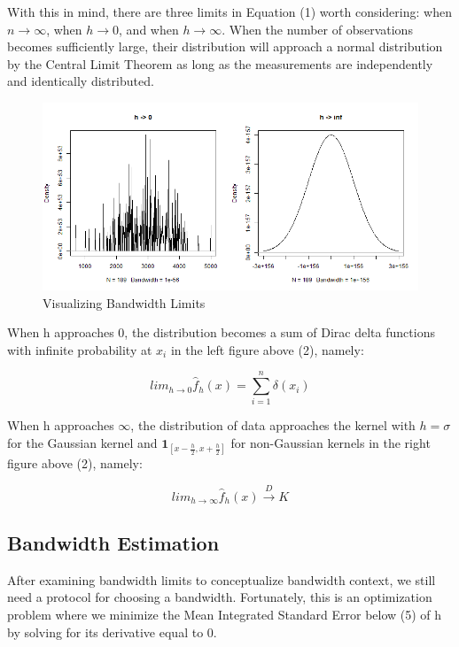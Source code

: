 \documentclass{article}
\begin{document}
With this in mind, there are three limits in Equation (1) worth considering: when $n \rightarrow \infty$, when $h \rightarrow 0$, and when $h \rightarrow \infty$. When the number of observations becomes sufficiently large, their distribution will approach a normal distribution by the Central Limit Theorem as long as the measurements are independently and identically distributed.

\begin{figure}[h]
    \centering
    \includegraphics[scale = 0.33]{volume/BandwidthLimits.png}
    \caption{Visualizing Bandwidth Limits}
    \label{fig:band-limts}
\end{figure}

\newpage

When h approaches 0, the distribution becomes a sum of Dirac delta functions with infinite probability at $x_i$ in the left figure above (2), namely:

\begin{equation}
    lim_{h \rightarrow0 } \hat f_h(x) = \sum_{i=1}^n \delta(x_i)
\end{equation}

When h approaches $\infty$, the distribution of data approaches the kernel with $h = \sigma$ for the Gaussian kernel and $\mathbf{1}_{[x-\frac{h}{2}, x+\frac{h}{2}]}$ for non-Gaussian kernels in the right figure above (2), namely:

\begin{equation}
    lim_{h \rightarrow \infty }\hat f_h(x)  \xrightarrow{D}K
\end{equation}

\subsection{Bandwidth Estimation}

After examining bandwidth limits to conceptualize bandwidth context, we still need a protocol for choosing a bandwidth. Fortunately, this is an optimization problem where we minimize the Mean Integrated Standard Error below (5) of h by solving for its derivative equal to 0.
\end{document}
